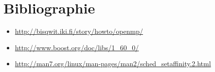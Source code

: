 \chapter{Bibliographie}

\begin{itemize}
    \item \url{http://bisqwit.iki.fi/story/howto/openmp/}
    \item \url{http://www.boost.org/doc/libs/1_60_0/}
    \item \url{http://man7.org/linux/man-pages/man2/sched_setaffinity.2.html}
\end{itemize}

\begingroup
\let\clearpage\relax
\listoffigures
\endgroup
